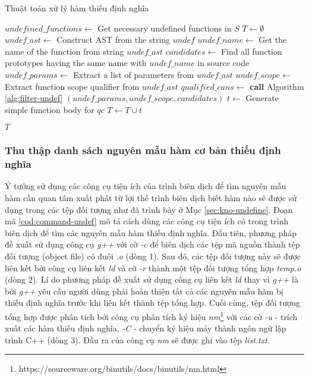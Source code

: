 \begin{algorithm}[ht]
    \small
    \caption{Thuật toán xử lý hàm thiếu định nghĩa}
    \label{alg:handle-ref}
					
    $undefined\_functions \leftarrow $ Get necessary undefined functions in $S$\;
    $T \leftarrow \emptyset$\;
     {
        $undef\_ast\leftarrow$ Construct AST from the string $undef$\;
        $undef\_name \leftarrow$ Get the name of the function from string $undef\_ast$\;
        $candidates \leftarrow$ Find all function prototypes having the same name with $undef\_name$ in source code\;
        $undef\_params \leftarrow$ Extract a list of parameters from $undef\_ast$\;
        $undef\_scope\leftarrow$ Extract function scope qualifier from $undef\_ast$\;
        $qualified\_cans\leftarrow$ \textbf{call} Algorithm \autoref{alg:filter-undef} $(undef\_params, undef\_scope, candidates)$\;
         {
            $t \leftarrow $ Generate simple function body for $qc$\;
            $T \leftarrow T \cup {t}$
        }
    }

    \Return $T$
\end{algorithm}

\subsubsection*{Thu thập danh sách nguyên mẫu hàm cơ bản thiếu định nghĩa}\label{sec:find-undef}
Ý tưởng sử dụng các công cụ tiện ích của trình biên dịch để tìm nguyên mẫu hàm cần quan tâm xuất phát từ lợi thế trình biên dịch biết hàm nào sẽ được sử dụng trong các tệp đối tượng như đã trình bày ở Mục \autoref{sec:kno-undefine}. Đoạn mã \autoref{cod:command-undef} mô tả cách dùng các công cụ tiện ích có trong trình biên dịch để tìm các nguyên mẫu hàm thiếu định nghĩa. Đầu tiên, phương pháp đề xuất sử dụng công cụ \textit{g++} với cờ \textit{-c} để biên dịch các tệp mã nguồn thành tệp đối tượng (object file) có đuôi \textit{.o} (dòng 1). Sau đó, các tệp đối tượng này sẽ được liên kết bởi công cụ liên kết \textit{ld} và cờ \textit{-r} thành một tệp đối tượng tổng hợp \textit{temp.o} (dòng 2). Lí do phương pháp đề xuất sử dụng công cụ liên kết \textit{ld} thay vì \textit{g++} là bởi \textit{g++} yêu cầu người dùng phải hoàn thiện tất cả các nguyên mẫu hàm bị thiếu định nghĩa trước khi liên kết thành tệp tổng hợp. Cuối cùng, tệp đối tượng tổng hợp được phân tích bởi công cụ phân tích ký hiệu \textit{nm}\footnote{https://sourceware.org/binutils/docs/binutils/nm.html} với các cờ \textit{-u} - trích xuất các hàm thiếu định nghĩa, \textit{-C} - chuyển ký hiệu máy thành ngôn ngữ lập trình C++ (dòng 3). Đầu ra của công cụ \textit{nm} sẽ được ghi vào tệp \textit{list.txt}.\\

